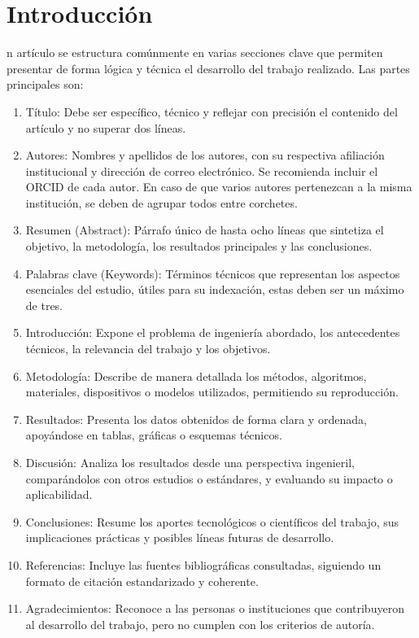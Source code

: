 \documentclass[12pt]{difu100cia} %
\begin{document}

\section{Introducción}
n artículo se estructura comúnmente en varias secciones clave que permiten presentar de forma lógica y técnica el desarrollo del trabajo realizado. Las partes principales son:

\begin{enumerate}
    \item Título: Debe ser específico, técnico y reflejar con precisión el contenido del artículo y no superar dos líneas.
    \item Autores: Nombres y apellidos de los autores, con su respectiva afiliación institucional y dirección de correo electrónico. Se recomienda incluir el ORCID de cada autor. En caso de que varios autores pertenezcan a la misma institución, se deben de agrupar todos entre corchetes.
    \item Resumen (Abstract): Párrafo único de hasta ocho líneas que sintetiza el objetivo, la metodología, los resultados principales y las conclusiones.
    \item Palabras clave (Keywords): Términos técnicos que representan los aspectos esenciales del estudio, útiles para su indexación, estas deben ser un máximo de tres.
    \item Introducción: Expone el problema de ingeniería abordado, los antecedentes técnicos, la relevancia del trabajo y los objetivos.
    \item Metodología: Describe de manera detallada los métodos, algoritmos, materiales, dispositivos o modelos utilizados, permitiendo su reproducción.
    \item Resultados: Presenta los datos obtenidos de forma clara y ordenada, apoyándose en tablas, gráficas o esquemas técnicos.
    \item Discusión: Analiza los resultados desde una perspectiva ingenieril, comparándolos con otros estudios o estándares, y evaluando su impacto o aplicabilidad.
    \item Conclusiones: Resume los aportes tecnológicos o científicos del trabajo, sus implicaciones prácticas y posibles líneas futuras de desarrollo.
    \item Referencias: Incluye las fuentes bibliográficas consultadas, siguiendo un formato de citación estandarizado y coherente.
    \item Agradecimientos: Reconoce a las personas o instituciones que contribuyeron al desarrollo del trabajo, pero no cumplen con los criterios de autoría.
\end{enumerate}
\end{document}
